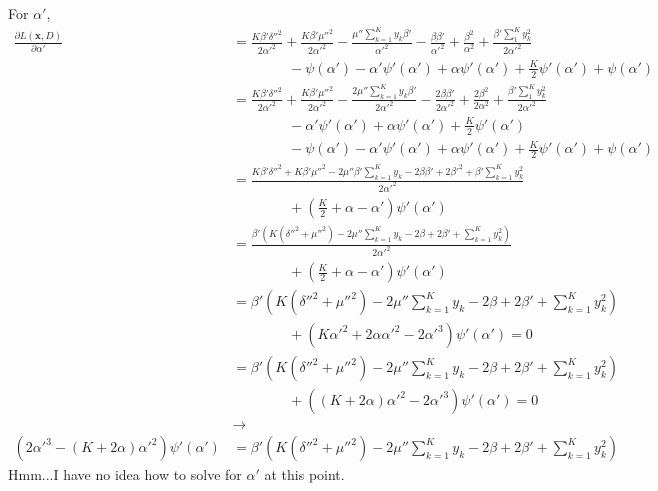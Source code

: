 \documentclass[12pt]{article}
\begin{document}
\begin{appendices}
For $\alpha'$,
\begin{align}
    \frac{\partial L(\bm{x}, D)}{\partial \alpha'} &=
    \frac{K\beta'\delta''^2}{2\alpha'^2} + \frac{K\beta'\mu''^2}{2\alpha'^2}
    - \frac{\mu''\sum_{k=1}^{K}y_{k}\beta'}{\alpha'^2}
    - \frac{\beta\beta'}{\alpha'^2} + \frac{\beta^2}{\alpha^2}
    + \frac{\beta'\sum_{1}^{K}y_{k}^2}{2\alpha'^2}
    \nonumber \\
    &\quad\quad\quad\quad
    - \psi(\alpha') - \alpha'\psi'(\alpha')
    + \alpha\psi'(\alpha') + \frac{K}{2}\psi'(\alpha')
    + \psi(\alpha')
    \nonumber \\
    &=
    \frac{K\beta'\delta''^2}{2\alpha'^2} + \frac{K\beta'\mu''^2}{2\alpha'^2}
    - \frac{2\mu''\sum_{k=1}^{K}y_{k}\beta'}{2\alpha'^2}
    - \frac{2\beta\beta'}{2\alpha'^2} + \frac{2\beta^2}{2\alpha^2}
    + \frac{\beta'\sum_{1}^{K}y_{k}^2}{2\alpha'^2}
    \nonumber \\
    &\quad\quad\quad\quad
    - \alpha'\psi'(\alpha')
    + \alpha\psi'(\alpha') + \frac{K}{2}\psi'(\alpha')
    \nonumber \\
    &\quad\quad\quad\quad
    - \psi(\alpha') - \alpha'\psi'(\alpha')
    + \alpha\psi'(\alpha') + \frac{K}{2}\psi'(\alpha')
    + \psi(\alpha')
    \nonumber \\
    &=
    \frac{K\beta'\delta''^2 + K\beta'\mu''^2
    - 2\mu''\beta'\sum_{k=1}^{K}y_{k}
    - 2\beta\beta' + 2\beta'^2
    + \beta'\sum_{k=1}^{K}y_{k}^2}{2\alpha'^2}
    \nonumber \\
    &\quad\quad\quad\quad
    + (\frac{K}{2} + \alpha - \alpha')\psi'(\alpha')
    \nonumber \\
    &=
    \frac{\beta'(K(\delta''^2 + \mu''^2)
    - 2\mu''\sum_{k=1}^{K}y_{k}
    - 2\beta + 2\beta'
    + \sum_{k=1}^{K}y_{k}^2)}{2\alpha'^2}
    \nonumber \\
    &\quad\quad\quad\quad
    + (\frac{K}{2} + \alpha - \alpha')\psi'(\alpha')
    \nonumber \\
    &=
    \beta'(K(\delta''^2 + \mu''^2)
    - 2\mu''\sum_{k=1}^{K}y_{k}
    - 2\beta + 2\beta'
    + \sum_{k=1}^{K}y_{k}^2)
    \nonumber \\
    &\quad\quad\quad\quad
    + (K\alpha'^2 + 2\alpha\alpha'^2 - 2\alpha'^3)\psi'(\alpha') = 0
    \nonumber \\
    &=
    \beta'(K(\delta''^2 + \mu''^2)
    - 2\mu''\sum_{k=1}^{K}y_{k}
    - 2\beta + 2\beta'
    + \sum_{k=1}^{K}y_{k}^2)
    \nonumber \\
    &\quad\quad\quad\quad
    + ((K + 2\alpha)\alpha'^2 - 2\alpha'^3)\psi'(\alpha') = 0
    \nonumber \\
    & \rightarrow
    \nonumber \\
    (2\alpha'^3 - (K + 2\alpha)\alpha'^2)\psi'(\alpha') &=
    \beta'(K(\delta''^2 + \mu''^2)
    - 2\mu''\sum_{k=1}^{K}y_{k}
    - 2\beta + 2\beta'
    + \sum_{k=1}^{K}y_{k}^2)
\end{align}
Hmm...I have no idea how to solve for $\alpha'$ at this point.


\end{appendices}
\end{document}
